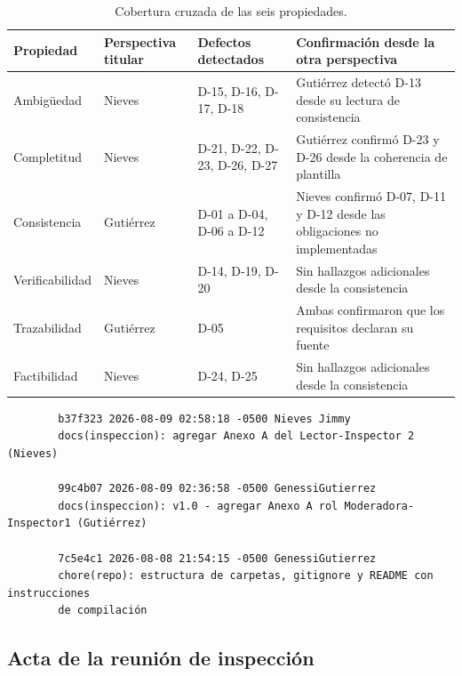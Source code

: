 \documentclass[journal,onecolumn]{IEEEtran}
\begin{document}
	\begin{table}[h!]
		\centering
		\caption{Cobertura cruzada de las seis propiedades.}
		\label{tab:cobertura-propiedades}
		\begin{tabular}{
				>{\raggedright\arraybackslash}p{2.3cm}
				>{\raggedright\arraybackslash}p{2cm}
				>{\raggedright\arraybackslash}p{2.8cm}
				>{\raggedright\arraybackslash}p{6.5cm}
			}
			\toprule
			\textbf{Propiedad} & \textbf{Perspectiva titular} & \textbf{Defectos detectados} & \textbf{Confirmación desde la otra perspectiva} \\
			\midrule
			Ambigüedad & Nieves & D-15, D-16, D-17, D-18 & Gutiérrez detectó
			D-13 desde su lectura de consistencia \\
			\addlinespace
			Completitud & Nieves & D-21, D-22, D-23, D-26, D-27 & Gutiérrez
			confirmó D-23 y D-26 desde la coherencia de plantilla \\
			\addlinespace
			Consistencia & Gutiérrez & D-01 a D-04, D-06 a D-12 & Nieves
			confirmó D-07, D-11 y D-12 desde las obligaciones no implementadas \\
			\addlinespace
			Verificabilidad & Nieves & D-14, D-19, D-20 & Sin hallazgos
			adicionales desde la consistencia \\
			\addlinespace
			Trazabilidad & Gutiérrez & D-05 & Ambas confirmaron que los
			requisitos declaran su fuente \\
			\addlinespace
			Factibilidad & Nieves & D-24, D-25 & Sin hallazgos adicionales
			desde la consistencia \\
			\bottomrule
		\end{tabular}
	\end{table}
	
	\begin{verbatim}
		b37f323 2026-08-09 02:58:18 -0500 Nieves Jimmy
		docs(inspeccion): agregar Anexo A del Lector-Inspector 2 (Nieves)
		
		99c4b07 2026-08-09 02:36:58 -0500 GenessiGutierrez
		docs(inspeccion): v1.0 - agregar Anexo A rol Moderadora-Inspector1 (Gutiérrez)
		
		7c5e4c1 2026-08-08 21:54:15 -0500 GenessiGutierrez
		chore(repo): estructura de carpetas, gitignore y README con instrucciones
		de compilación
	\end{verbatim}
	
	\subsection{Acta de la reunión de inspección}
	
\end{document}
